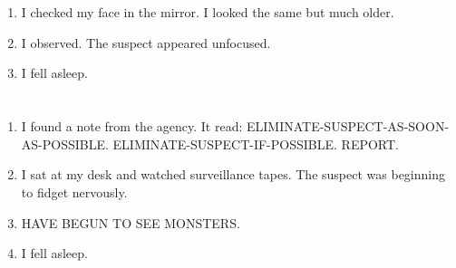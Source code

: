 \documentclass{article}
\begin{document}
    \newpage
    
    \section{}
    
    \begin{enumerate}
    
    \item I checked my face in the mirror. I looked the same but much older.\\
    
    \item I observed. The suspect appeared unfocused.\\
    
    \item I fell asleep.\\
    
    \end{enumerate}
     
    \newpage
    
    \section{}
    
    \begin{enumerate}
    
    \item I found a note from the agency. It read: ELIMINATE-SUSPECT-AS-SOON-AS-POSSIBLE. ELIMINATE-SUSPECT-IF-POSSIBLE. REPORT.\\
    
    \item I sat at my desk and watched surveillance tapes. The suspect was beginning to fidget nervously.\\
    
    \item HAVE BEGUN TO SEE MONSTERS.\\
    
    \item I fell asleep.\\
    
    \end{enumerate}
     
    \newpage
    
    \section{}
    
\end{document}
